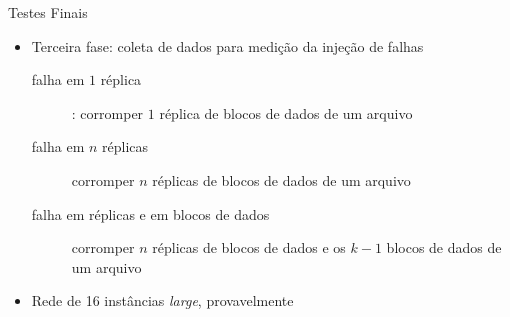   \begin{frame}{Testes Finais}
     \begin{itemize}
        \item<3-> Terceira fase: coleta de dados para medição da injeção de falhas
           \begin{description}
              \item [falha em $1$ réplica]: corromper $1$ réplica de blocos de dados de um arquivo
              \item [falha em $n$ réplicas] corromper $n$ réplicas de blocos de dados de um arquivo
              \item [falha em réplicas e em blocos de dados] corromper $n$ réplicas de blocos de dados e os $k-1$ blocos de dados de um arquivo
            \end{description}
        \item<4-> Rede de 16 instâncias \emph{large}, provavelmente
     \end{itemize}
  \end{frame}
